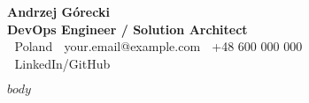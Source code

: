 \documentclass[a4paper,10pt]{article}
\begin{document}
\begin{center}
    {\Huge \textbf{Andrzej Górecki}} \\
    \vspace{0.2cm}
    \textbf{DevOps Engineer / Solution Architect} \\
    \vspace{0.1cm}
    📍 Poland \quad 📧 your.email@example.com \quad 📱 +48 600 000 000 \\
    💼 LinkedIn/GitHub
\end{center}

\vspace{0.5cm}

\begin{multicols}{2}
$body$
\end{multicols}
\end{document}
